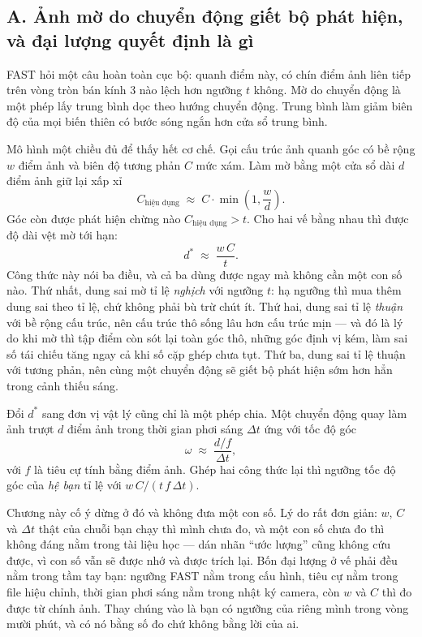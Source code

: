 \documentclass[../../deep_learning.tex]{subfiles}
\begin{document}
\subsection{A. Ảnh mờ do chuyển động giết bộ phát hiện, và đại lượng quyết định là gì}
FAST hỏi một câu hoàn toàn cục bộ: quanh điểm này, có chín điểm ảnh liên tiếp trên vòng tròn bán kính 3 nào lệch hơn ngưỡng \(t\) không. Mờ do chuyển động là một phép lấy trung bình dọc theo hướng chuyển động. Trung bình làm giảm biên độ của mọi biến thiên có bước sóng ngắn hơn cửa sổ trung bình.

Mô hình một chiều đủ để thấy hết cơ chế. Gọi cấu trúc ảnh quanh góc có bề rộng \(w\) điểm ảnh và biên độ tương phản \(C\) mức xám. Làm mờ bằng một cửa sổ dài \(d\) điểm ảnh giữ lại xấp xỉ
\[
C_{\text{hiệu dụng}} \;\approx\; C \cdot \min\!\left(1, \frac{w}{d}\right).
\]
Góc còn được phát hiện chừng nào \(C_{\text{hiệu dụng}} > t\). Cho hai vế bằng nhau thì được độ dài vệt mờ tới hạn:
\[
d^{*} \;\approx\; \frac{w\,C}{t}.
\]
Công thức này nói ba điều, và cả ba dùng được ngay mà không cần một con số nào. Thứ nhất, dung sai mờ tỉ lệ \emph{nghịch} với ngưỡng \(t\): hạ ngưỡng thì mua thêm dung sai theo tỉ lệ, chứ không phải bù trừ chút ít. Thứ hai, dung sai tỉ lệ \emph{thuận} với bề rộng cấu trúc, nên cấu trúc thô sống lâu hơn cấu trúc mịn --- và đó là lý do khi mờ thì tập điểm còn sót lại toàn góc thô, những góc định vị kém, làm sai số tái chiếu tăng ngay cả khi số cặp ghép chưa tụt. Thứ ba, dung sai tỉ lệ thuận với tương phản, nên cùng một chuyển động sẽ giết bộ phát hiện sớm hơn hẳn trong cảnh thiếu sáng.

Đổi \(d^{*}\) sang đơn vị vật lý cũng chỉ là một phép chia. Một chuyển động quay làm ảnh trượt \(d\) điểm ảnh trong thời gian phơi sáng \(\Delta t\) ứng với tốc độ góc
\[
\omega \;\approx\; \frac{d/f}{\Delta t},
\]
với \(f\) là tiêu cự tính bằng điểm ảnh. Ghép hai công thức lại thì ngưỡng tốc độ góc của \emph{hệ bạn} tỉ lệ với \(w\,C/(t\,f\,\Delta t)\).

Chương này cố ý dừng ở đó và không đưa một con số. Lý do rất đơn giản: \(w\), \(C\) và \(\Delta t\) thật của chuỗi bạn chạy thì mình chưa đo, và một con số chưa đo thì không đáng nằm trong tài liệu học --- dán nhãn ``ước lượng'' cũng không cứu được, vì con số vẫn sẽ được nhớ và được trích lại. Bốn đại lượng ở vế phải đều nằm trong tầm tay bạn: ngưỡng FAST nằm trong cấu hình, tiêu cự nằm trong file hiệu chỉnh, thời gian phơi sáng nằm trong nhật ký camera, còn \(w\) và \(C\) thì đo được từ chính ảnh. Thay chúng vào là bạn có ngưỡng của riêng mình trong vòng mười phút, và có nó bằng số đo chứ không bằng lời của ai.
\end{document}
